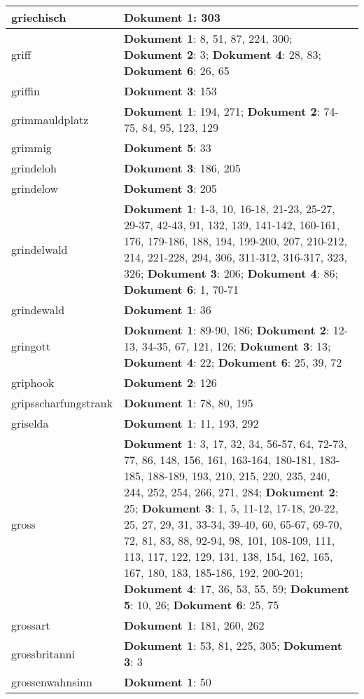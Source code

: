 \documentclass[a5paper]{article}
\begin{document}
\begin{longtable}[l]{|l|p{3in}|}
\hline
griechisch & \textbf{Dokument 1}: 303 \\
\hline
griff & \textbf{Dokument 1}: 8, 51, 87, 224, 300; \textbf{Dokument 2}: 3; \textbf{Dokument 4}: 28, 83; \textbf{Dokument 6}: 26, 65 \\
\hline
griffin & \textbf{Dokument 3}: 153 \\
\hline
grimmauldplatz & \textbf{Dokument 1}: 194, 271; \textbf{Dokument 2}: 74-75, 84, 95, 123, 129 \\
\hline
grimmig & \textbf{Dokument 5}: 33 \\
\hline
grindeloh & \textbf{Dokument 3}: 186, 205 \\
\hline
grindelow & \textbf{Dokument 3}: 205 \\
\hline
grindelwald & \textbf{Dokument 1}: 1-3, 10, 16-18, 21-23, 25-27, 29-37, 42-43, 91, 132, 139, 141-142, 160-161, 176, 179-186, 188, 194, 199-200, 207, 210-212, 214, 221-228, 294, 306, 311-312, 316-317, 323, 326; \textbf{Dokument 3}: 206; \textbf{Dokument 4}: 86; \textbf{Dokument 6}: 1, 70-71 \\
\hline
grindewald & \textbf{Dokument 1}: 36 \\
\hline
gringott & \textbf{Dokument 1}: 89-90, 186; \textbf{Dokument 2}: 12-13, 34-35, 67, 121, 126; \textbf{Dokument 3}: 13; \textbf{Dokument 4}: 22; \textbf{Dokument 6}: 25, 39, 72 \\
\hline
griphook & \textbf{Dokument 2}: 126 \\
\hline
gripsscharfungstrank & \textbf{Dokument 1}: 78, 80, 195 \\
\hline
griselda & \textbf{Dokument 1}: 11, 193, 292 \\
\hline
gross & \textbf{Dokument 1}: 3, 17, 32, 34, 56-57, 64, 72-73, 77, 86, 148, 156, 161, 163-164, 180-181, 183-185, 188-189, 193, 210, 215, 220, 235, 240, 244, 252, 254, 266, 271, 284; \textbf{Dokument 2}: 25; \textbf{Dokument 3}: 1, 5, 11-12, 17-18, 20-22, 25, 27, 29, 31, 33-34, 39-40, 60, 65-67, 69-70, 72, 81, 83, 88, 92-94, 98, 101, 108-109, 111, 113, 117, 122, 129, 131, 138, 154, 162, 165, 167, 180, 183, 185-186, 192, 200-201; \textbf{Dokument 4}: 17, 36, 53, 55, 59; \textbf{Dokument 5}: 10, 26; \textbf{Dokument 6}: 25, 75 \\
\hline
grossart & \textbf{Dokument 1}: 181, 260, 262 \\
\hline
grossbritanni & \textbf{Dokument 1}: 53, 81, 225, 305; \textbf{Dokument 3}: 3 \\
\hline
grossenwahnsinn & \textbf{Dokument 1}: 50 \\
\hline

\end{longtable}
\end{document}
